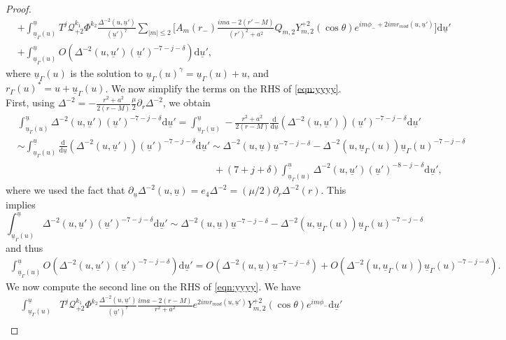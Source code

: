 \documentclass[reqno]{amsart}
\numberwithin{equation}{section}
\newcommand{\mcq}{\mathcal{Q}}
\newcommand{\ubar}{{\underline{u}}}
\newcommand{\carterp}{\mcq_{+2}}
\newcommand{\dee}{\mathrm{d}}
\newcommand{\sfrak}{2}
\theoremstyle{plain}
\theoremstyle{definition}
\theoremstyle{remark}
\numberwithin{equation}{section}
\begin{document}
\begin{proof}
\begin{align}
    &+\int_{\ubar_\Gamma(u)}^\ubar T^j\carterp^{k_1}\Phi^{k_2}\frac{\Delta^{-2}(u,\ubar')}{(\ubar')^7}\sum_{|m|\leq2}\Big[A_m(r_-)\frac{ima-2(r'-M)}{(r')^2+a^2}Q_{m,\sfrak}Y_{m,\sfrak}^{+\sfrak}(\cos\theta)e^{im\phi_{-}+2imr_{mod}(u,\ubar')}\Big]\dee\ubar'\nonumber\\
    &+ \int_{\ubar_\Gamma(u)}^\ubar O(\Delta^{-2}(u,\ubar')(\ubar')^{-7-j-\delta})\dee\ubar',\label{eqn:yyyy}
\end{align}
{where $\ubar_{\Gamma}(u)$ is the solution to $\ubar_{\Gamma}(u)^\gamma=\ubar_{\Gamma}(u)+u$, and $r_\Gamma(u)^*=u+\ubar_{\Gamma}(u)$}. We now simplify the terms on the RHS of \eqref{eqn:yyyy}. First, {using $\Delta^{-2}=-\frac{r^2+a^2}{2(r-M)}\frac{\mu}{2}\partial_r\Delta^{-2}$, we obtain }
\begin{align*}
    &\int_{\ubar_\Gamma(u)}^\ubar\Delta^{-2}(u,\ubar')(\ubar')^{-7-j-\delta}\dee\ubar'=\int_{\ubar_\Gamma(u)}^\ubar-\frac{r^2+a^2}{2(r-M)}\frac{\dee}{\dee\ubar}(\Delta^{-2}(u,\ubar'))(\ubar')^{-7-j-\delta}\dee\ubar'\\
    &\sim\int_{\ubar_\Gamma(u)}^\ubar\frac{\dee}{\dee\ubar}(\Delta^{-2}(u,\ubar'))(\ubar')^{-7-j-\delta}\dee\ubar'\sim \Delta^{-2}(u,\ubar)\ubar^{-7-j-\delta}-\Delta^{-2}(u,\ubar_\Gamma(u))\ubar_\Gamma(u)^{-7-j-\delta}\\
    &\quad\quad\quad\quad\quad\quad\quad\quad\quad\quad\quad\quad\quad\quad\quad\quad\quad\quad\quad\quad+(7+j+\delta)\int_{\ubar_\Gamma(u)}^\ubar\Delta^{-2}(u,\ubar')(\ubar')^{-8-j-\delta}\dee\ubar',
\end{align*}
where we used the fact that $\partial_\ubar\Delta^{-2}(u,\ubar)=e_4\Delta^{-2}=(\mu/2)\partial_r\Delta^{-2}(r)$. This implies 
$$\int_{\ubar_\Gamma(u)}^\ubar\Delta^{-2}(u,\ubar')(\ubar')^{-7-j-\delta}\dee\ubar'\sim\Delta^{-2}(u,\ubar)\ubar^{-7-j-\delta}-\Delta^{-2}(u,\ubar_\Gamma(u))\ubar_\Gamma(u)^{-7-j-\delta}$$
and thus
\begin{align}\label{eqn:delta1}
    \int_{\ubar_\Gamma(u)}^\ubar O(\Delta^{-2}(u,\ubar')(\ubar')^{-7-j-\delta})\dee\ubar'=O(\Delta^{-2}(u,\ubar)\ubar^{-7-j-\delta})+O(\Delta^{-2}(u,\ubar_\Gamma(u))\ubar_\Gamma(u)^{-7-j-\delta}).
\end{align}
We now compute the second line on the RHS of \eqref{eqn:yyyy}. We have 
\begin{align}
    \int_{\ubar_\Gamma(u)}^\ubar &T^j\carterp^{k_1}\Phi^{k_2}\frac{\Delta^{-2}(u,\ubar')}{(\ubar')^7}\frac{ima-2(r-M)}{r^2+a^2}e^{2imr_{mod}(u,\ubar')}Y_{m,\sfrak}^{+\sfrak}(\cos\theta)e^{im\phi_{-}}\dee\ubar'\nonumber\\

\end{align}
\end{proof}
\end{document}
